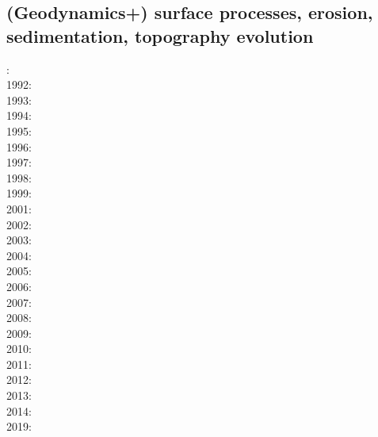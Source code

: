 \subsection*{(Geodynamics+) surface processes, erosion, sedimentation, topography evolution}
 

: \cite{cull60}\\
1992: \cite{befh92}\\
1993: \cite{povp93}\\
1994: \cite{howa94}\cite{koon94}\cite{kobe94}\\
1995: \cite{chmm95}\cite{koon95}\\
1996: \cite{avbu96}\cite{bekh96}\cite{kobe96}\\
1997: \cite{brsa97}\cite{gaft97}\cite{babr97}\\
1998: \cite{deea98}\cite{vabr98}\cite{koon98}\\
1999: \cite{will99a}\cite{bupi99}\cite{babr99}\\
2001: \cite{zemk01}\cite{tulg01}\cite{brsh01}\cite{bupo01}\cite{coul01}\cite{crda01}\\
2002: \cite{wibr02}\cite{mobr02}\cite{garc02}\\
2003: \cite{brau03}\\
2004: \cite{fijj04}\cite{gocl04}\\
2005: \cite{lave05}\cite{will05}\\
2006: \cite{rosw06}\cite{brau06gsl}\cite{bocr06}\\
2007: \cite{buto07}\cite{sebp07}\\
2008: \cite{alle08}\cite{rowf08}\\
2009: \cite{whip09}\cite{kuhe09}\cite{makh09}\cite{pina09}\\
2010: \cite{will10}\cite{tuha10}\cite{brau10b}\cite{brau10}\cite{brya10}\cite{cmwt10}\\
2011: \cite{robr11}\cite{grhd11}\\
2012: \cite{kiwh12}\\
2013: \cite{vehc13}\cite{brwi13}\cite{fihv13a}\cite{fihv13b}\cite{brrs13}\cite{chgz13} \\
2014: \cite{crbr14}\cite{cokm14}\cite{erhv14}\cite{erhv15} \\
2019: \cite{anpa19}


